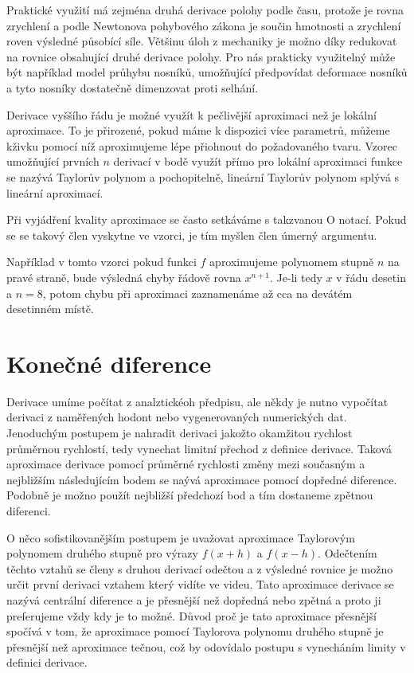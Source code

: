 \documentclass[12pt]{article}
\begin{document}
Praktické využití má zejména druhá derivace polohy podle času, protože je rovna zrychlení a podle Newtonova pohybového zákona je součin hmotnosti a zrychlení roven výsledné působící síle. Většinu úloh z mechaniky je možno díky redukovat na rovnice obsahující druhé derivace polohy. Pro nás prakticky využitelný může být například model průhybu nosníků, umožňující předpovídat deformace nosníků a tyto nosníky dostatečně dimenzovat proti selhání.  

Derivace vyššího řádu je možné využít k pečlivější aproximaci než je lokální aproximace. To je přirozené, pokud máme k dispozici více parametrů, můžeme kživku pomocí níž aproximujeme lépe přiohnout do požadovaného tvaru. Vzorec umožňující prvních $n$ derivací v bodě využít přímo pro lokální aproximaci funkce se nazývá Taylorův polynom a pochopitelně, lineární Taylorův polynom splývá s lineární aproximací.

Při vyjádření kvality aproximace se často setkáváme s takzvanou O notací. Pokud se se takový člen vyskytne ve vzorci, je tím myšlen člen úmerný argumentu.

Například v tomto vzorci pokud funkci $f$ aproximujeme polynomem stupně $n$ na pravé straně, bude výsledná chyby řádově rovna $x^{n+1}$. Je-li tedy $x$ v řádu desetin a $n=8$, potom chybu při aproximaci zaznamenáme až cca na devátém desetinném místě.


\section*{Konečné diference}

Derivace umíme počítat z analztickéoh předpisu, ale někdy je nutno vypočítat derivaci z naměřených hodont nebo vygenerovaných numerických dat. Jenoduchým postupem je nahradit derivaci jakožto okamžitou rychlost průměrnou rychlostí, tedy vynechat limitní přechod z definice derivace. Taková aproximace derivace pomocí průměrné rychlosti změny mezi současným a nejbližším následujícím bodem se naývá aproximace pomocí dopředné diference. Podobně je možno použít nejbližší předchozí bod a tím dostaneme zpětnou diferenci.

O něco sofistikovanějším postupem je uvažovat aproximace Taylorovým polynomem druhého stupně pro výrazy $f(x+h)$ a $f(x-h)$. Odečtením těchto vztahů se členy s druhou derivací odečtou a z výsledné rovnice je možno určit první derivaci vztahem který vidíte ve videu. Tato aproximace derivace se nazývá centrální diference a je přesnější než dopředná nebo zpětná a proto ji preferujeme vždy kdy je to možné. Důvod proč je tato aproximace přesnější spočívá v tom, že aproximace pomocí Taylorova polynomu druhého stupně je přesnější než aproximace tečnou, což by odovídalo postupu s vynecháním limity v definici derivace.
\end{document}
